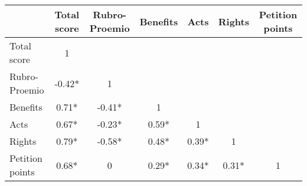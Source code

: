 \begin{tabular}{l|cccccc}
\toprule
\multicolumn{1}{r}{} & Total score & Rubro-Proemio & Benefits & Acts  & Rights & Petition points \\
\midrule
\midrule
Total score & 1     &       &       &       &       &  \\
Rubro-Proemio & -0.42* & 1     &       &       &       &  \\
Benefits & 0.71* & -0.41* & 1     &       &       &  \\
Acts  & 0.67* & -0.23* & 0.59* & 1     &       &  \\
Rights & 0.79* & -0.58* & 0.48* & 0.39* & 1     &  \\
Petition points & 0.68* & 0     & 0.29* & 0.34* & 0.31* & 1 \\
\bottomrule
\bottomrule
\end{tabular}%
